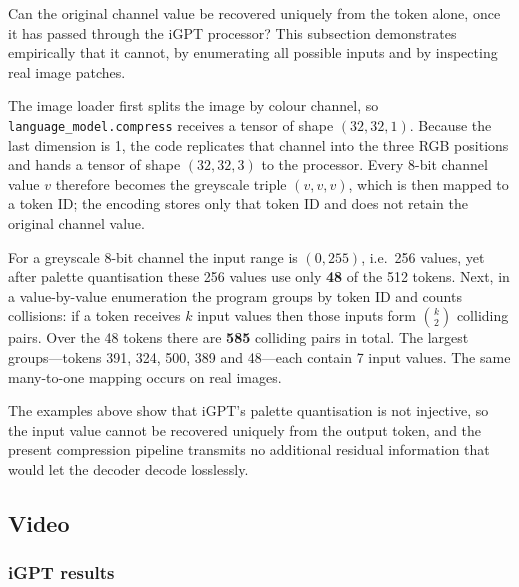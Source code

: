 \documentclass[12pt,a4paper]{article}
\begin{document}
Can the original channel value be recovered uniquely from the token alone, once it has passed
through the iGPT processor? This subsection demonstrates empirically that it cannot, by
enumerating all possible inputs and by inspecting real image patches.

The image loader first splits the image by colour channel, so \texttt{language\_model.compress}
receives a tensor of shape $(32,32,1)$. Because the last dimension is 1, the code replicates
that channel into the three RGB positions and hands a tensor of shape $(32,32,3)$ to the
processor. Every 8-bit channel value $v$ therefore becomes the greyscale triple $(v,v,v)$,
which is then mapped to a token ID; the encoding stores only that token ID and does not retain
the original channel value.

For a greyscale 8-bit channel the input range is $(0,255)$, i.e.\ 256 values, yet after palette
quantisation these 256 values use only \textbf{48} of the 512 tokens. Next, in a value-by-value
enumeration the program groups by token ID and counts collisions: if a token receives $k$ input
values then those inputs form $\binom{k}{2}$ colliding pairs. Over the 48 tokens there are
\textbf{585} colliding pairs in total. The largest groups---tokens 391, 324, 500, 389 and
48---each contain 7 input values. The same many-to-one mapping occurs on real images.

The examples above show that iGPT's palette quantisation is not injective, so the input value
cannot be recovered uniquely from the output token, and the present compression pipeline
transmits no additional residual information that would let the decoder decode losslessly.

\subsection{Video}

\subsubsection{iGPT results}
\end{document}
